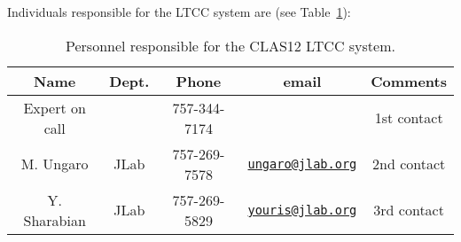 Individuals responsible for the LTCC system are (see Table~\ref{tb:ltcc}):

\begin{table}[!htb]
\centering
\begin{tabular}{|c|c|c|c|c|} \hline
Name           & Dept.& Phone        & email & Comments \\ \hline
Expert on call &      & 757-344-7174 &       & 1st contact \\ \hline
M. Ungaro      & JLab & 757-269-7578 &\href{mailto:ungaro@jlab.org}{\nolinkurl{ungaro@jlab.org}}&2nd contact \\ \hline
Y. Sharabian   & JLab & 757-269-5829 &\href{mailto:youris@jlab.org}{\nolinkurl{youris@jlab.org}}&3rd contact \\ \hline
 \end{tabular}
\caption{Personnel responsible for the CLAS12 LTCC system.} 
\label{tb:ltcc}
\end{table}

